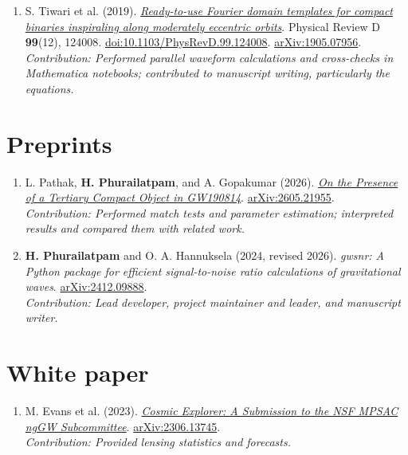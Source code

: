 \documentclass[11pt]{article}
\begin{document}
\begin{enumerate}
\item S. Tiwari et al. (2019). \href{https://doi.org/10.1103/PhysRevD.99.124008}{\textit{Ready-to-use Fourier domain templates for compact binaries inspiraling along moderately eccentric orbits}}. Physical Review D \textbf{99}(12), 124008. \href{https://doi.org/10.1103/PhysRevD.99.124008}{doi:10.1103/PhysRevD.99.124008}. \href{https://arxiv.org/abs/1905.07956}{arXiv:1905.07956}.\\\emph{Contribution: Performed parallel waveform calculations and cross-checks in Mathematica notebooks; contributed to manuscript writing, particularly the equations.}
\end{enumerate}
\section*{Preprints}
\begin{enumerate}[start=11]
\item L. Pathak, \textbf{H. Phurailatpam}, and A. Gopakumar (2026). \href{https://arxiv.org/abs/2605.21955}{\textit{On the Presence of a Tertiary Compact Object in GW190814}}. \href{https://arxiv.org/abs/2605.21955}{arXiv:2605.21955}.\\\emph{Contribution: Performed match tests and parameter estimation; interpreted results and compared them with related work.}
\item \textbf{H. Phurailatpam} and O. A. Hannuksela (2024, revised 2026). \textit{gwsnr: A Python package for efficient signal-to-noise ratio calculations of gravitational waves}. \href{https://arxiv.org/abs/2412.09888}{arXiv:2412.09888}.\\\emph{Contribution: Lead developer, project maintainer and leader, and manuscript writer.}
\end{enumerate}
\section*{White paper}
\begin{enumerate}[start=13]
\item M. Evans et al. (2023). \href{https://arxiv.org/abs/2306.13745}{\textit{Cosmic Explorer: A Submission to the NSF MPSAC ngGW Subcommittee}}. \href{https://arxiv.org/abs/2306.13745}{arXiv:2306.13745}.\\\emph{Contribution: Provided lensing statistics and forecasts.}
\end{enumerate}
\end{document}
